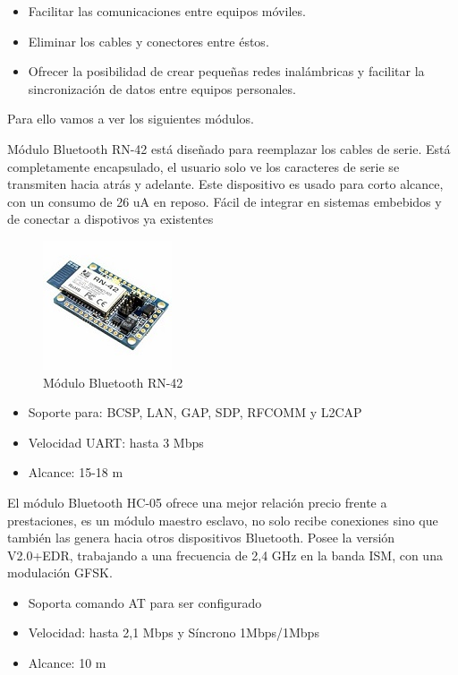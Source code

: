 				\begin{itemize}
					\item Facilitar las comunicaciones entre equipos móviles.
					\item Eliminar los cables y conectores entre éstos.
					\item Ofrecer la posibilidad de crear pequeñas redes inalámbricas y facilitar la sincronización de datos entre equipos personales.
				\end{itemize}
				
				Para ello vamos a ver los siguientes módulos.
				
				Módulo Bluetooth RN-42 \cite{RN42} está dise\~nado para reemplazar los cables de serie. Está completamente encapsulado, el usuario solo ve los caracteres de serie se transmiten hacia atrás y adelante. Este dispositivo es usado para corto alcance, con un consumo de 26 uA en reposo. Fácil de integrar en sistemas embebidos y de conectar a dispotivos ya existentes 
				
				\begin{figure}[h]
					\centering
					\includegraphics{imagenes/RN42.jpg}
					\caption{Módulo Bluetooth RN-42}
					\label{contexto:figura}
				\end{figure}
				
				\begin{itemize}
					\item Soporte para: BCSP, LAN, GAP, SDP, RFCOMM y L2CAP
					\item Velocidad UART: hasta 3 Mbps
					\item Alcance: 15-18 m 
				\end{itemize}
				
							
				El módulo Bluetooth HC-05 \cite{HC05} ofrece una mejor relación precio frente a prestaciones, es un módulo maestro esclavo, no solo recibe conexiones sino que también las genera hacia otros dispositivos Bluetooth. Posee la versión V2.0+EDR, trabajando a una frecuencia de 2,4 GHz en la banda ISM, con una modulación GFSK.
				
				\begin{itemize}
					\item Soporta comando AT para ser configurado
					\item Velocidad: hasta 2,1 Mbps y Síncrono 1Mbps/1Mbps
					\item Alcance: 10 m 
				\end{itemize}
				
